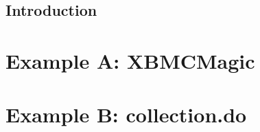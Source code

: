 \chapter{Introduction}



\part{Example A: XBMCMagic}
\label{part:xbmc}

\part{Example B: collection.do}
\label{part:collection}
